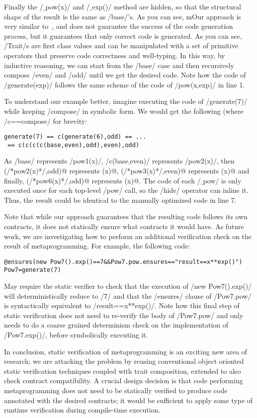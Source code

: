 Finally the /$\_$pow(x)/ and /$\_$exp()/ method are hidden, so that the structural shape of the result is
the same as /base/'s.
As you can see, mOur approach is very similar to~\cite{servetto2014meta}, and does not guarantee the success of the code generation process, but it guarantees that only correct code is generated.
As you can see, /Trait/s are first class values and can be manipulated with a set of primitive operators that preserve code correctness and well-typing.
In this way, by inductive reasoning, we can start from the /base/ case and then recursively compose /even/ and /odd/ until we get the desired code.
Note how the code of /generate(exp)/ follows the same scheme of the code of /pow(x,exp)/ in line 1.

To understand our example better, imagine executing the code of /generate(7)/ while keeping /compose/ in symbolic form. We would get the following (where /c==compose/ for brevity:
\vspace{-1ex}
\begin{lstlisting}[numbers=none]
generate(7) == c(generate(6),odd) == ...
 == c(c(c(c(base,even),odd),even),odd)
\end{lstlisting}
\vspace{-1ex}
As /base/ represents /pow1(x)/, /c(base,even)/ represents /pow2(x)/, then \Q@c(/*pow2(x)*/,odd)@ represents (x)@, \Q@c(/*pow3(x)*/,even)@ represents (x)@ and finally,
\Q@c(/*pow6(x)*/,odd)@ represents (x)@.
The code of each /$\_$pow/ is only executed once for each top-level /pow/ call, so the /hide/ operator can inline it.
Thus, the result could be identical to the manually optimized code in line 7.

Note that while our approach guarantees that the resulting code follows its own contracts, it does not statically ensure what contracts it would have.
As future work, we are investigating how
to perform an additional verification check
on the result of metaprogramming.
For example, the following code:
\vspace{-1ex}
\begin{lstlisting}[numbers=none]
@ensures(new Pow7().exp()==7&&Pow7.pow.ensures=="result==x**exp()")
Pow7=generate(7)
\end{lstlisting}
\vspace{-1ex}
May require the static verifier to check that the execution of
/new Pow7().exp()/ will deterministically reduce to /7/ and that the /ensures/ clause of 
/Pow7.pow/ is syntactically equivalent to 
/result==x**exp()/. Note how this final step of static verification does not need to re-verify the body of
/Pow7.pow/ and only needs to do a coarse grained 
determinism check on the implementation of /Pow7.exp()/, before symbolically executing it.

In conclusion, static verification of metaprogramming is an exciting new area of research; we are attacking the problem by reusing conventional
object oriented static verification techniques coupled with trait composition, extended to also check contract compatibility. A crucial design decision is that code performing metaprogramming does not need to be statically verified to produce code annotated with the desired contracts; it would be sufficient to apply some type of runtime verification during compile-time execution.